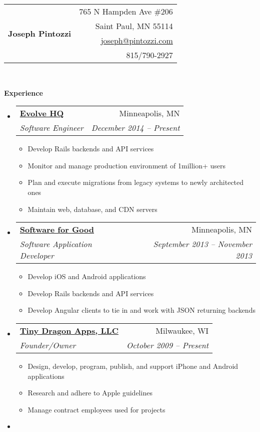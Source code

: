 \documentclass[letterpaper,12pt]{article}
\makeatletter
\newcommand{\resitem}[1]{\item #1 \vspace{-2pt}}
\newcommand{\resheading}[1]{{\large \colorbox{mygrey}{\begin{minipage}{\textwidth}{\textbf{#1 \vphantom{p\^{E}}}}\end{minipage}}}}
\newcommand{\ressubheading}[4]{
\begin{tabular*}{6.5in}{l@{\extracolsep{\fill}}r}
		\textbf{#1} & #2 \\
		\textit{#3} & \textit{#4} \\
\end{tabular*}\vspace{-6pt}}
\makeatother
\begin{document}
\newcommand{\mywebheader}{
\begin{tabular*}{7in}{l@{\extracolsep{\fill}}r}
	\multirow{4}{*}{\huge \bf Joseph Pintozzi} & {765 N Hampden Ave \#206}\\
														& {Saint Paul, MN 55114}\\
														& \href{mailto:joseph@pintozzi.com}{joseph@pintozzi.com}\\
														& {815/790-2927}
	\end{tabular*}
\\
\vspace{0.1in}
}

\mywebheader

\resheading{Experience}
	\begin{itemize}
     \item
			\ressubheading{\href{http://evolvehq.com/}{Evolve HQ}}{Minneapolis, MN}{Software Engineer}{December 2014 -- Present}
				{ \footnotesize
				\begin{itemize}
					\resitem{Develop Rails backends and API services}
					\resitem{Monitor and manage production environment of 1million+ users}
					\resitem{Plan and execute migrations from legacy systems to newly architected ones}
					\resitem{Maintain web, database, and CDN servers}
				\end{itemize}
         }
     \item
			\ressubheading{\href{http://softwareforgood.com/}{Software for Good}}{Minneapolis, MN}{Software Application Developer}{September 2013 -- November 2013}
				{ \footnotesize
				\begin{itemize}
					\resitem{Develop iOS and Android applications}
					\resitem{Develop Rails backends and API services}
					\resitem{Develop Angular clients to tie in and work with JSON returning backends}
				\end{itemize}
         }
     \item
			\ressubheading{\href{http://itunes.apple.com/WebObjects/MZStore.woa/wa/viewArtist?id=337595590}{Tiny Dragon Apps, LLC}}{Milwaukee, WI}{Founder/Owner}{October 2009 -- Present}
				{ \footnotesize
				\begin{itemize}
					\resitem{Design, develop, program, publish, and support iPhone and Android applications}
					\resitem{Research and adhere to Apple guidelines}
					\resitem{Manage contract employees used for projects}
				\end{itemize}
         }
     \item

\end{itemize}
\end{document}
